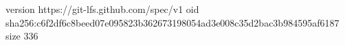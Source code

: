 version https://git-lfs.github.com/spec/v1
oid sha256:c6f2df6c8beed07e095823b362673198054ad3e008c35d2bac3b984595af6187
size 336
